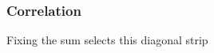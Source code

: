 \documentclass[handout]{beamer}
\begin{document}
   \begin{frame}
   \frametitle{Correlation}
   \begin{center}
   \end{center}
   Fixing the sum selects this diagonal strip
   \end{frame}


   \begin{frame} 

   \end{frame}

   
\end{document}
